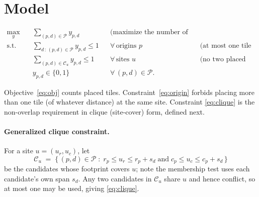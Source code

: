 \documentclass[11pt]{article}
\newcommand{\Pset}{\mathcal{P}}
\begin{document}
\section{Model}

\begin{align}
  \max_{y} \quad & \sum_{(p,d) \in \Pset} y_{p,d}
    && \text{(maximize the number of placed tiles)} \label{eq:obj}\\[4pt]
  \text{s.t.} \quad
    & \sum_{d \,:\, (p,d) \in \Pset} y_{p,d} \le 1
    && \forall\, \text{origins } p
    && \text{(at most one tile per site)} \label{eq:origin}\\[2pt]
    & \sum_{(p,d) \in \mathcal{C}_u} y_{p,d} \le 1
    && \forall\, \text{sites } u
    && \text{(no two placed tiles overlap)} \label{eq:clique}\\[2pt]
    & y_{p,d} \in \{0,1\}
    && \forall\, (p,d) \in \Pset. && \label{eq:bin}
\end{align}

Objective~\eqref{eq:obj} counts placed tiles. Constraint~\eqref{eq:origin} forbids
placing more than one tile (of whatever distance) at the same site. Constraint
\eqref{eq:clique} is the non-overlap requirement in clique (site-cover) form,
defined next.

\paragraph{Generalized clique constraint.}
For a site $u = (u_r, u_c)$, let
\[
  \mathcal{C}_u \;=\; \bigl\{\, (p,d) \in \Pset \;:\;
  r_p \le u_r \le r_p + s_d \;\text{and}\; c_p \le u_c \le c_p + s_d \,\bigr\}
\]
be the candidates whose footprint covers $u$; note the membership test uses each
candidate's own span $s_d$. Any two candidates in $\mathcal{C}_u$ share $u$ and
hence conflict, so at most one may be used, giving \eqref{eq:clique}.
\end{document}
